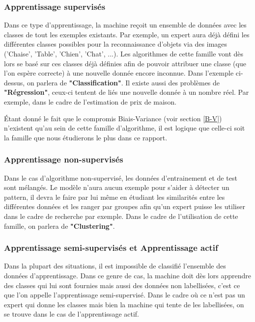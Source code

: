 \documentclass[a4paper]{article}
\begin{document}
\subsubsection{Apprentissage supervisés}
Dans ce type d'apprentissage, la machine reçoit un ensemble de données avec les classes de tout les exemples existants.
Par exemple, un expert aura déjà défini les différentes classes possibles pour la reconnaissance d'objets via des images ('Chaise', 'Table', 'Chien', 'Chat', ...). Les algorithmes de cette famille vont dès lors se basé sur ces classes déjà définies afin de pouvoir attribuer une classe (que l'on espère correcte) à une nouvelle donnée encore inconnue. Dans l'exemple ci-dessus, on parlera de \textbf{"Classification"}. \newline
Il existe aussi des problèmes de \textbf{"Régression"}, ceux-ci tentent de liés une nouvelle donnée à un nombre réel. Par exemple, dans le cadre de l'estimation de prix de maison. \newline

Étant donné le fait que le compromis Biais-Variance (voir section \ref{B-V}) n'existent qu'au sein de cette famille d'algorithme, il est logique que celle-ci soit la famille que nous étudierons le plus dans ce rapport.

\subsubsection{Apprentissage non-supervisés}
Dans le cas d'algorithme non-supervisé, les données d'entrainement et de test sont mélangés. Le modèle n'aura aucun exemple pour s'aider à détecter un pattern, il devra le faire par lui même en étudiant les similarités entre les différentes données et les ranger par groupes afin qu'un expert puisse les utiliser dans le cadre de recherche par exemple. Dans le cadre de l'utilisation de cette famille, on parlera de \textbf{"Clustering"}. \newline

\subsubsection{Apprentissage semi-supervisés et Apprentissage actif}
Dans la plupart des situations, il est impossible de classifié l'ensemble des données d'apprentissage. Dans ce genre de cas, la machine doit dès lors apprendre des classes qui lui sont fournies mais aussi des données non labellisées, c'est ce que l'on appelle l'apprentissage semi-supervisé. Dans le cadre où ce n'est pas un expert qui donne les classes mais bien la machine qui tente de les labellisées, on se trouve dans le cas de l'apprentissage actif. 
\end{document}
